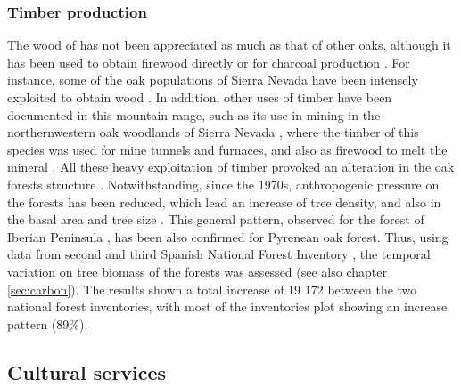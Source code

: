 \subsubsection{Timber production}\label{sec:es:provision-timber}
The wood of \Qp has not been appreciated as much as that of other oaks, although it has been used to obtain firewood directly or for charcoal production \autocites{MontoyaMeson1979SituacionActual}. For instance, some of the oak populations of Sierra Nevada have been intensely exploited to obtain wood \autocites[\emph{e.g.} Robledal de Cáñar, Alpujarras,][]{ValbuenaCarabanaGil2013GeneticResilience,MorenoLlorca2016}. In addition, other uses of timber have been documented in this mountain range, such as its use in mining in the northernwestern oak woodlands of Sierra Nevada \autocites{Titos1990}, where the timber of this species was used for mine tunnels and furnaces, and also as firewood to melt the mineral \autocites{Titos1990}. All these heavy exploitation of timber provoked an alteration in the oak forests structure \autocite{PerezLuqueetal2020LanduseLegacies}. Notwithstanding, since the 1970s, anthropogenic pressure on the forests has been reduced, which lead an increase of tree density, and also in the basal area and tree size \autocite{GonzalezDiazetal2020BosquesEspanoles}. This general pattern, observed for the forest of Iberian Peninsula \autocite{Astigarragaetal2020EvidenceNon,GonzalezDiazetal2020BosquesEspanoles}, has been also confirmed for Pyrenean oak forest. Thus, using data from second and third Spanish National Forest Inventory \autocites{VillaescusaDiaz1998SegundoInventario,Villanueva2005TercerInventario}, the temporal variation on tree biomass of the \Qp forests was assessed \autocites{PerezLuqueetal2021CarbonSequestration} (see also chapter \ref{sec:carbon}). The results shown a total increase of 19 172 \mgha between the two national forest inventories, with most of the inventories plot showing an increase pattern (89\%). 


\subsection{Cultural services}\label{sec:es:cultural}
